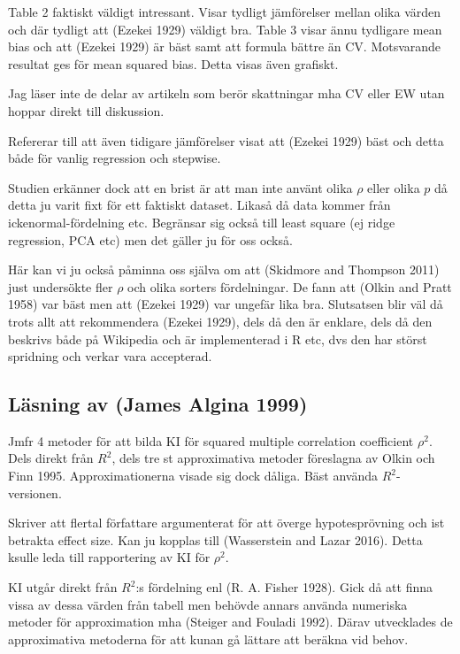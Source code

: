 \documentclass[]{article}
\begin{document}
Table 2 faktiskt väldigt intressant. Visar tydligt jämförelser mellan
olika värden och där tydligt att (Ezekei 1929) väldigt bra. Table 3
visar ännu tydligare mean bias och att (Ezekei 1929) är bäst samt att
formula bättre än CV. Motsvarande resultat ges för mean squared bias.
Detta visas även grafiskt.

Jag läser inte de delar av artikeln som berör skattningar mha CV eller
EW utan hoppar direkt till diskussion.

Refererar till att även tidigare jämförelser visat att (Ezekei 1929)
bäst och detta både för vanlig regression och stepwise.

Studien erkänner dock att en brist är att man inte använt olika \(\rho\)
eller olika \(p\) då detta ju varit fixt för ett faktiskt dataset.
Likaså då data kommer från ickenormal-fördelning etc. Begränsar sig
också till least square (ej ridge regression, PCA etc) men det gäller ju
för oss också.

Här kan vi ju också påminna oss själva om att (Skidmore and Thompson
2011) just undersökte fler \(\rho\) och olika sorters fördelningar. De
fann att (Olkin and Pratt 1958) var bäst men att (Ezekei 1929) var
ungefär lika bra. Slutsatsen blir väl då trots allt att rekommendera
(Ezekei 1929), dels då den är enklare, dels då den beskrivs både på
Wikipedia och är implementerad i R etc, dvs den har störst spridning och
verkar vara accepterad.

\subsection{Läsning av (James Algina 1999)}\label{lasning-av-algina1999}

Jmfr 4 metoder för att bilda KI för squared multiple correlation
coefficient \(\rho^2\). Dels direkt från \(R^2\), dels tre st
approximativa metoder föreslagna av Olkin och Finn 1995.
Approximationerna visade sig dock dåliga. Bäst använda
\(R^2\)-versionen.

Skriver att flertal författare argumenterat för att överge
hypotesprövning och ist betrakta effect size. Kan ju kopplas till
(Wasserstein and Lazar 2016). Detta ksulle leda till rapportering av KI
för \(\rho^2\).

KI utgår direkt från \(R^2\):s fördelning enl (R. A. Fisher 1928). Gick
då att finna vissa av dessa värden från tabell men behövde annars
använda numeriska metoder för approximation mha (Steiger and Fouladi
1992). Därav utvecklades de approximativa metoderna för att kunan gå
lättare att beräkna vid behov.
\end{document}
